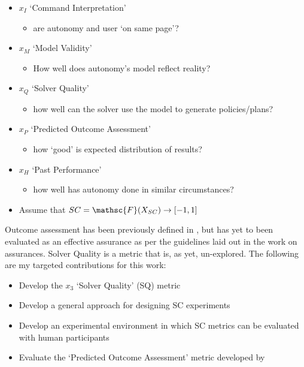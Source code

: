         \begin{itemize}
            \item $x_I$ `Command Interpretation'
            \begin{itemize}
                \item are autonomy and user `on same page'?
            \end{itemize}
            \item $x_M$ `Model Validity'
            \begin{itemize}
                \item How well does autonomy's model reflect reality?
            \end{itemize}
            \item $x_Q$ `Solver Quality'
            \begin{itemize}
                \item how well can the solver use the model to generate policies/plans?
            \end{itemize}
            \item $x_P$ `Predicted Outcome Assessment'
            \begin{itemize}
                \item how `good' is expected distribution of results?
            \end{itemize}
            \item $x_H$ `Past Performance'
            \begin{itemize}
                \item how well has autonomy done in similar circumstances?
            \end{itemize}
            \item Assume that $SC = \mathsc{F}(X_{SC})\rightarrow [-1,1]$
        \end{itemize}

    Outcome assessment has been previously defined in \cite{Aitken2016-cv}, but has yet to been evaluated as an effective assurance as per the guidelines laid out in the work on assurances. Solver Quality is a metric that is, as yet, un-explored. The following are my targeted contributions for this work:

    \begin{itemize}
        \item Develop the $x_3$ `Solver Quality' (SQ) metric
        \item Develop a general approach for designing SC experiments
        \item Develop an experimental environment in which SC metrics can be evaluated with human participants
        \item Evaluate the `Predicted Outcome Assessment' metric developed by \cite{Aitken2016-cv}
    \end{itemize}

